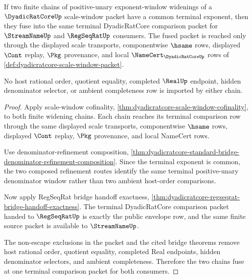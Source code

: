 \begin{theorem}
\label{thm:dyadicratcore-scale-window-terminal-fusion}
If two finite chains of positive-unary exponent-window widenings of a $\DyadicRatCoreUp$ scale-window packet have a common terminal exponent, then they fuse into the same terminal DyadicRatCore comparison packet for $\StreamNameUp$ and $\RegSeqRatUp$ consumers. The fused packet is reached only through the displayed scale transports, componentwise $\hsame$ rows, displayed $\Cont$ replay, $\Pkg$ provenance, and local $\NameCert_{\DyadicRatCoreUp}$ rows of \autoref{def:dyadicratcore-scale-window-packet}.

No host rational order, quotient equality, completed $\RealUp$ endpoint, hidden denominator selector, or ambient completeness row is imported by either chain.
\end{theorem}
\begin{proof}
Apply scale-window cofinality, \autoref{thm:dyadicratcore-scale-window-cofinality}, to both finite widening chains. Each chain reaches its terminal comparison row through the same displayed scale transports, componentwise $\hsame$ rows, displayed $\Cont$ replay, $\Pkg$ provenance, and local NameCert rows.

Use denominator-refinement composition, \autoref{thm:dyadicratcore-standard-bridge-denominator-refinement-composition}. Since the terminal exponent is common, the two composed refinement routes identify the same terminal positive-unary denominator window rather than two ambient host-order comparisons.

Now apply RegSeqRat bridge handoff exactness, \autoref{thm:dyadicratcore-regseqrat-bridge-handoff-exactness}. The terminal DyadicRatCore comparison packet handed to $\RegSeqRatUp$ is exactly the public envelope row, and the same finite source packet is available to $\StreamNameUp$.

The non-escape exclusions in the packet and the cited bridge theorems remove host rational order, quotient equality, completed Real endpoints, hidden denominator selectors, and ambient completeness. Therefore the two chains fuse at one terminal comparison packet for both consumers.
\end{proof}

